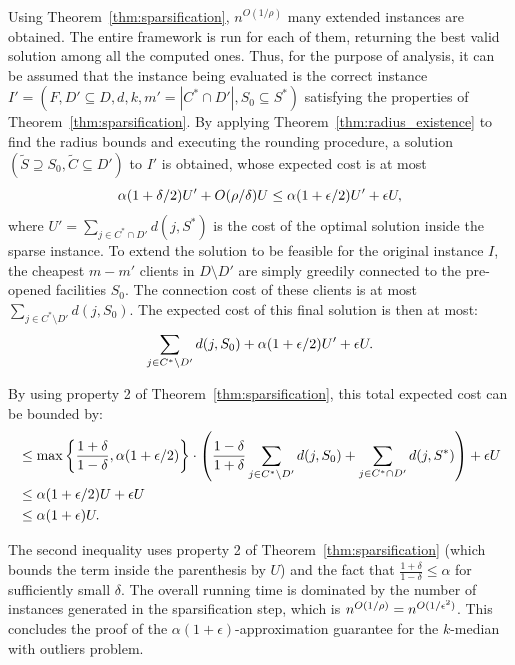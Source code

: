 Using Theorem~\ref{thm:sparsification}, $n^{O(1/\rho)}$ many extended instances are obtained. The entire framework is run for each of them, returning the best valid solution among all the computed ones. Thus, for the purpose of analysis, it can be assumed that the instance being evaluated is the correct instance $I' = (F, D' \subseteq D, d, k, m' = |C^* \cap D'|, S_0 \subseteq S^*)$ satisfying the properties of Theorem~\ref{thm:sparsification}. By applying Theorem~\ref{thm:radius_existence} to find the radius bounds and executing the rounding procedure, a solution $(\tilde{S} \supseteq S_0, \tilde{C} \subseteq D')$ to $I'$ is obtained, whose expected cost is at most
\[ \alpha(1+\delta/2)U' + O(\rho/\delta)U \le \alpha(1+\epsilon/2)U' + \epsilon U, \]
where $U' = \sum_{j \in C^* \cap D'} d(j, S^*)$ is the cost of the optimal solution inside the sparse instance. To extend the solution to be feasible for the original instance $I$, the cheapest $m - m'$ clients in $D \setminus D'$ are simply greedily connected to the pre-opened facilities $S_0$. The connection cost of these clients is at most $\sum_{j \in C^* \setminus D'} d(j, S_0)$. The expected cost of this final solution is then at most:
\[ \sum_{j \in C^* \setminus D'} d(j, S_0) + \alpha(1+\epsilon/2)U' + \epsilon U. \]

By using property 2 of Theorem~\ref{thm:sparsification}, this total expected cost can be bounded by:
\begin{align*}
&\le \max \left\{ \frac{1+\delta}{1-\delta}, \alpha(1+\epsilon/2) \right\} \cdot \left( \frac{1-\delta}{1+\delta}\sum_{j \in C^* \setminus D'} d(j, S_0) + \sum_{j \in C^* \cap D'} d(j, S^*) \right) + \epsilon U \\
&\le \alpha(1+\epsilon/2)U + \epsilon U \\
&\le \alpha(1+\epsilon)U.
\end{align*}

The second inequality uses property 2 of Theorem~\ref{thm:sparsification} (which bounds the term inside the parenthesis by $U$) and the fact that $\frac{1+\delta}{1-\delta} \le \alpha$ for sufficiently small $\delta$. The overall running time is dominated by the number of instances generated in the sparsification step, which is $n^{O(1/\rho)} = n^{O(1/\epsilon^2)}$. This concludes the proof of the $\alpha(1+\epsilon)$-approximation guarantee for the $k$-median with outliers problem.
